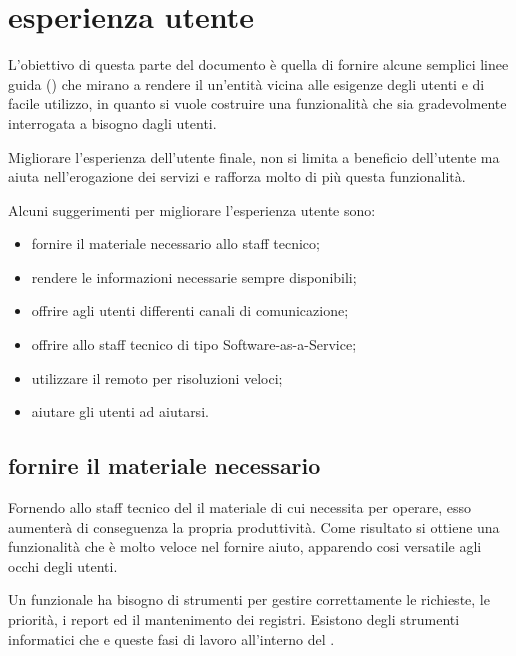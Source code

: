 %
%
\section[Esperienza utente]{esperienza utente}
\label{sd-users-experience}
L'obiettivo di questa parte del documento è quella di fornire alcune semplici linee guida () che mirano a rendere il  un'entità vicina alle esigenze degli utenti e di facile utilizzo, in quanto si vuole costruire una funzionalità che sia gradevolmente interrogata a bisogno dagli utenti.


Migliorare l'esperienza dell'utente finale, non si limita a beneficio dell'utente ma aiuta nell'erogazione dei servizi e rafforza molto di più questa funzionalità.

Alcuni suggerimenti per migliorare l'esperienza utente sono:

\begin{itemize}
\item{fornire il materiale necessario allo staff tecnico;}
\item{rendere le informazioni necessarie sempre disponibili;}
\item{offrire agli utenti differenti canali di comunicazione;}
\item{offrire allo staff tecnico  di tipo \acs{Software-as-a-Service};}
\item{utilizzare il  remoto per risoluzioni veloci;}
\item{aiutare gli utenti ad aiutarsi.}
\end{itemize}

\subsection[Fornire il materiale necessario]{fornire il materiale necessario}
Fornendo allo staff tecnico del  il materiale di cui necessita per operare, esso aumenterà di conseguenza la propria produttività. Come risultato si ottiene una funzionalità che è molto veloce nel fornire aiuto, apparendo cosi versatile agli occhi degli utenti.

Un  funzionale ha bisogno di strumenti per gestire correttamente le richieste, le priorità, i report ed il mantenimento dei registri. Esistono degli strumenti informatici che  e  queste fasi di lavoro all'interno del .

